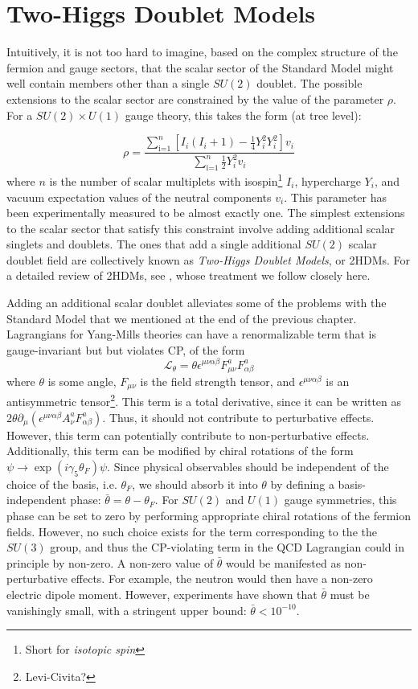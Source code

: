 \chapter{Two-Higgs Doublet Models}\label{ch:2HDMs}

Intuitively, it is not too hard to imagine, based on the complex structure of the fermion and gauge sectors, that the scalar sector of the Standard Model might well contain members other than a single $SU(2)$ doublet. The possible extensions to the scalar sector are constrained by the value of the parameter $\rho$. For a $SU(2)\times U(1)$ gauge theory, this takes the form (at tree level):

\begin{equation}
\rho = \frac{\sum_\text{i=1}^n\left[I_i(I_i+1)-\frac{1}{4}Y_i^2Y_i^2\right]v_i}{\sum_\text{i=1}^n\frac{1}{2}Y_i^2v_i}
\end{equation}
%
where $n$ is the number of scalar multiplets with isospin\footnote{Short for \emph{isotopic spin}} $I_i$, hypercharge $Y_i$, and vacuum expectation values of the neutral components $v_i$. This parameter has been experimentally measured to be almost exactly one. The simplest extensions to the scalar sector that satisfy this constraint involve adding additional scalar singlets and doublets. The ones that add a single additional $SU(2)$ scalar doublet field are collectively known as \emph{Two-Higgs Doublet Models}, or 2HDMs. For a detailed review of 2HDMs, see \citep{Branco2012}, whose treatment we follow closely here.

Adding an additional scalar doublet alleviates some of the problems with the Standard Model that we mentioned at the end of the previous chapter. 
Lagrangians for Yang-Mills theories can have a renormalizable term that is gauge-invariant but but violates CP, of the form
\[\mathcal{L}_{\theta} = \theta\epsilon^{\mu\nu\alpha\beta}F_{\mu\nu}^aF_{\alpha\beta}^a\]
where $\theta$ is some angle, $F_{\mu\nu}$ is the field strength tensor, and $\epsilon^{\mu\nu\alpha\beta}$ is an antisymmetric tensor\footnote{Levi-Civita?}. This term is a total derivative, since it can be written as $2\theta\partial_\mu(\epsilon^{\mu\nu\alpha\beta}A_\nu^aF_{\alpha\beta}^a)$. Thus, it should not contribute to perturbative effects. However, this term can potentially contribute to non-perturbative effects. Additionally, this term can be modified by chiral rotations of the form $\psi\rightarrow \exp(i\gamma_5\theta_F)\psi$. Since physical observables should be independent of the choice of the basis, i.e. $\theta_F$, we should absorb it into $\theta$ by defining a basis-independent phase: $\bar{\theta} = \theta-\theta_F$. For $SU(2)$ and $U(1)$ gauge symmetries, this phase can be set to zero by performing appropriate chiral rotations of the fermion fields. However, no such choice exists for the term corresponding to the the $SU(3)$ group, and thus the CP-violating term in the QCD Lagrangian could in principle by non-zero. A non-zero value of $\bar{\theta}$ would be manifested as non-perturbative effects. For example, the neutron would then have a non-zero electric dipole moment. However, experiments have shown that $\bar{\theta}$ must be vanishingly small, with a stringent upper bound: $\bar{\theta}<10^{-10}$.

